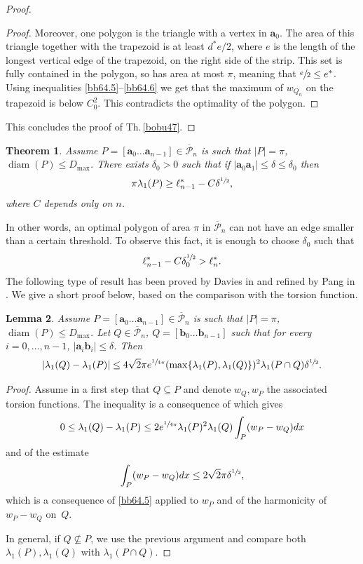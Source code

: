 \documentclass[JEP,XML,SOM,Unicode,ThmDefs,NoFloatCountersInSection,published]{cedram}
\theoremstyle{plain}
\newtheorem{thm}{Theorem}[section]
\newtheorem{lemma}[thm]{Lemma}
\theoremstyle{definition}
\newcommand{\bo}[1]{{\boldsymbol#1}}
\newcommand{\diam}{\operatorname{diam}}
\newcommand{\lb}{\lambda}
\newcommand{\sq}{\subseteq}
\newcommand{\ov}{\overline}
\begin{document}
\begin{proof}
\begin{proof}
Moreover, one polygon is the triangle with a vertex in $\bo a_0$. The area of this triangle together with the {trapezoid} is at least $d^* e/2$, where $e$ is the length of the longest vertical edge of the {trapezoid}, on the right side of the strip. This set is fully contained in the polygon, so has area at most $\pi$, meaning that $\sfrac e2 \le e^*$. Using inequalities \eqref{bb64.5}--\eqref{bb64.6} we get that the maximum of $w_{Q_n}$ on the {trapezoid} is below $C_0^2$. This contradicts the optimality of the polygon.
\end{proof}
This concludes the proof of Th.\,\ref{bobu47}.
\end{proof}

\begin{thm}\label{bobu220}
Assume $P=[\bo a_0\dots \bo a_{n-1}] \in \ov {\mathcal P}_n$ is such that $|P|=\pi$, $\diam (P)\le D_{\max}$. There exists $\delta _0 >0$ such that if $|\bo a_0\bo a_1|\le \delta\le \delta_0$ then
\begin{equation}\label{bobu221}
\pi \lb_1(P)\ge \ell_{n-1}^*-C\delta^{\sfrac12},
\end{equation}
where $C $ depends only on $n$.
\end{thm}
In other words, an optimal polygon of area $\pi$ in $\overline {\mathcal P}_n$ can not have an edge smaller than a certain threshold. To observe this fact, it is enough to choose $\delta_0 $ such that
\begin{equation}
\ell_{n-1}^*-C\delta_0^{\sfrac 12}> \ell_n^*.
\label{eq:delta-edge-min}
\end{equation}
The following type of result has been proved by Davies in \cite{Da93} and refined by Pang in \cite{Pa97}. We give a short proof below, based on the comparison with the torsion function.
\begin{lemma}\label{bobu223}
Assume $P=[\bo a_0\dots\bo a_{n-1}] \in \ov {\mathcal P}_n$ is such that $|P|=\pi$, $\diam (P)\le D_{\max}$. Let $Q \in \ov {\mathcal P}_n$, $Q=[\bo b_0\dots\bo b_{n-1}] $ such that for every $i=0, \dots, n-1$, $|\bo a_i\bo b_i|\le \delta$.
Then
\[
|\lb_1(Q)-\lb_1(P)| \le 4 \sqrt{2}\pi e^{\sfrac{1}{4\pi}}(\max \{\lb_1(P), \lb_1(Q)\})^2\lb_1(P\cap Q) \delta^{\sfrac 12}.
\]
\end{lemma}
\begin{proof}
Assume in a first step that $Q \sq P$ and {denote $w_Q, w_P$ the associated torsion functions}.
The inequality is a consequence of \cite[Ineq.\,(2.6)]{BuMa15} which gives
\[
0\le \lb_1(Q)-\lb_1(P) \le 2e^{\sfrac{1}{4\pi}}\lb_1(P)^2\lb_1(Q)\int_P (w_P-w_Q) dx
\]
and of the estimate
\[
\int_P (w_P-w_Q) dx \le 2\sqrt{2} \pi \delta^{\sfrac 12},
\]
which is a consequence of \eqref{bb64.5} applied to $w_P$ and of the harmonicity of $w_P-w_Q$ on~$Q$.

In general, if $Q \not \sq P$, we use the previous argument and compare both $\lb_1(P), \lb_1(Q)$ with $\lb_1(P\cap Q)$.
\end{proof}
\end{document}

